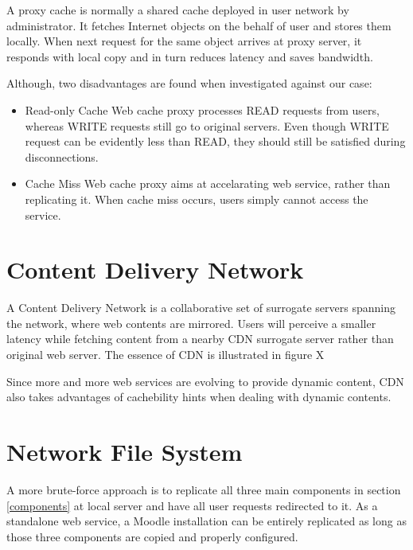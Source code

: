 A proxy cache is normally a shared cache deployed in user network by administrator. It fetches Internet objects on the behalf of user and stores them locally. When next request for the same object arrives at proxy server, it responds with local copy and in turn reduces latency and saves bandwidth.

Although, two disadvantages are found when investigated against our case:
\begin{itemize}
\item Read-only Cache
Web cache proxy processes READ requests from users, whereas WRITE requests still go to original servers. Even though WRITE request can be evidently less than READ, they should still be satisfied during disconnections.
\item Cache Miss
Web cache proxy aims at accelarating web service, rather than replicating it. When cache miss occurs, users simply cannot access the service.
\end{itemize}


\section{Content Delivery Network}
A Content Delivery Network is a collaborative set of surrogate servers spanning the network, where web contents are mirrored\cite{pathan2008content}. Users will perceive a smaller latency while fetching content from a nearby CDN surrogate server rather than original web server. The essence of CDN is illustrated in figure X

Since more and more web services are evolving to provide dynamic content, CDN also takes advantages of cachebility hints when dealing with dynamic contents\cite{dilley2002globally}. 



\section{Network File System}
A more brute-force approach is to replicate all three main components in section \ref{components} at local server and have all user requests redirected to it. As a standalone web service, a Moodle installation can be entirely replicated as long as those three components are copied and properly configured.

